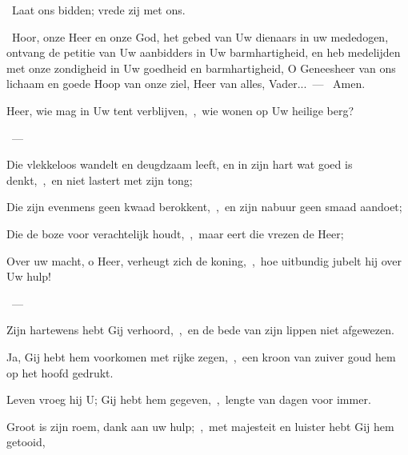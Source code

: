 \documentclass[12pt,twoside,a5paper]{article}
\begin{document}
\begin{halfparskip}
  \dd~Laat ons bidden; vrede zij met ons.

  \cc~Hoor, onze Heer en onze God, het gebed van Uw dienaars in uw mededogen, ontvang de petitie van Uw aanbidders in Uw barmhartigheid, en heb medelijden met onze zondigheid in Uw goedheid en barmhartigheid, O Geneesheer van ons lichaam en goede Hoop van onze ziel, Heer van alles, Vader...~--- \rr~Amen.
\end{halfparskip}



\begin{halfparskip}
\end{halfparskip}

\begin{halfparskip}
    Heer, wie mag in Uw tent verblijven,~\sep\ wie wonen op Uw heilige berg?

  ~--- 

  Die vlekkeloos wandelt en deugdzaam leeft, en in zijn hart wat goed is denkt,~\sep\ en niet lastert met zijn tong;

  Die zijn evenmens geen kwaad berokkent,~\sep\ en zijn nabuur geen smaad aandoet;

  Die de boze voor verachtelijk houdt,~\sep\ maar eert die vrezen de Heer;
\end{halfparskip}

\begin{halfparskip}
    Over uw macht, o Heer, verheugt zich de koning,~\sep\ hoe uitbundig jubelt hij over Uw hulp!

  ~--- 

  Zijn hartewens hebt Gij verhoord,~\sep\ en de bede van zijn lippen niet afgewezen.

  Ja, Gij hebt hem voorkomen met rijke zegen,~\sep\ een kroon van zuiver goud hem op het hoofd gedrukt.

  Leven vroeg hij U; Gij hebt hem gegeven,~\sep\ lengte van dagen voor immer.

  Groot is zijn roem, dank aan uw hulp;~\sep\ met majesteit en luister hebt Gij hem getooid,
\end{halfparskip}
\end{document}
